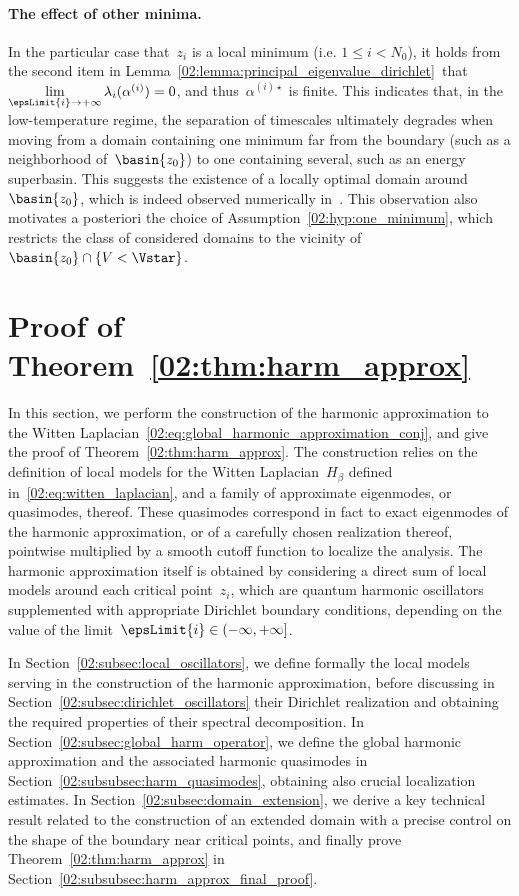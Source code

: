     \paragraph{The effect of other minima.}
    In the particular case that~$z_i$ is a local minimum (i.e. $1\leq i<N_0$), it holds from the second item in Lemma~\ref{02:lemma:principal_eigenvalue_dirichlet}~that~$\underset{\epsLimit{i}\to+\infty}{\lim}\,{\lambda_i(\alpha^{(i)})}=0$, and thus~$\alpha^{(i)\star}$ is finite.
    This indicates that, in the low-temperature regime, the separation of timescales ultimately degrades when moving from a domain containing one minimum far from the boundary (such as a neighborhood of~$\basin{z_0}$) to one containing several, such as an energy superbasin. This suggests the existence of a locally optimal domain around~$\basin{z_0}$, which is indeed observed numerically in~\cite{BLS24}.
    This observation also motivates a posteriori the choice of Assumption~\eqref{02:hyp:one_minimum}, which restricts the class of considered domains to the vicinity of~$\basin{z_0}\cap\{V<\Vstar\}$.

    \section{Proof of Theorem~\ref{02:thm:harm_approx}}\label{02:sec:proof_thm1}
    \label{02:sec:proof_harm_approx}
    In this section, we perform the construction of the harmonic approximation to the Witten Laplacian~\eqref{02:eq:global_harmonic_approximation_conj}, and give the proof of Theorem~\ref{02:thm:harm_approx}.
    The construction relies on the definition of local models for the Witten Laplacian~$H_\beta$ defined in~\eqref{02:eq:witten_laplacian}, and a family of approximate eigenmodes, or quasimodes, thereof.
    These quasimodes correspond in fact to exact eigenmodes of the harmonic approximation, or of a carefully chosen realization thereof, pointwise multiplied by a smooth cutoff function to localize the analysis.
    The harmonic approximation itself is obtained by considering a direct sum of local models around each critical point~$z_i$, which are quantum harmonic oscillators supplemented with appropriate Dirichlet boundary conditions, depending on the value of the limit~$\epsLimit{i} \in (-\infty,+\infty]$.
    
    In Section~\ref{02:subsec:local_oscillators}, we define formally the local models serving in the construction of the harmonic approximation, before discussing in Section~\ref{02:subsec:dirichlet_oscillators} their Dirichlet realization and obtaining the required properties of their spectral decomposition. In Section~\ref{02:subsec:global_harm_operator}, we define the global harmonic approximation and the associated harmonic quasimodes in Section~\ref{02:subsubsec:harm_quasimodes}, obtaining also crucial localization estimates.
    In Section~\ref{02:subsec:domain_extension}, we derive a key technical result related to the construction of an extended domain with a precise control on the shape of the boundary near critical points, and finally prove Theorem~\ref{02:thm:harm_approx} in Section~\ref{02:subsubsec:harm_approx_final_proof}.
